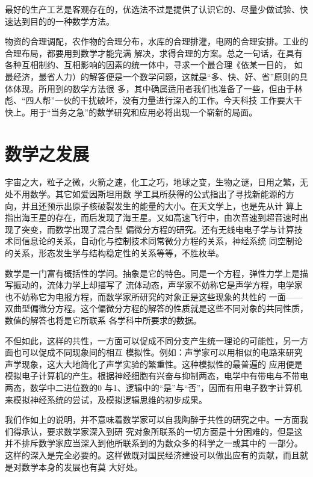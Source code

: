 \documentclass[twoside,openright,headings=optiontohead]{ctexbook} %
\begin{document}
{最好的生产工艺是客观存在的，优选法不过是提供了认识它的、尽量少做试验、快速达到目的的一种数学方法。

物资的合理调配，农作物的合理分布，水库的合理排灌，电网的合理安排。工业的合理布局，都要用到数学才能完满
解决，求得合理的方案。总之一句话，在具有各种互相制约、互相影响的因素的统一体中，寻求一个最合理《依某一目的，
如最经济，最省人力）的解答便是一个数学问题，这就是``多、快、好、省''原则的具体体现。所用到的数学方法很
多，其中确属适用者我们也准备了一些，但由于林彪、``四人帮''一伙的干扰破坏，没有力量进行深入的工作。今天科技
工作要大干快上。用于``当务之急''的数学研究和应用必将出现一个崭新的局面。

\hypertarget{ux6570ux5b66ux4e4bux53d1ux5c55}{%
\section*{数学之发展}\label{ux6570ux5b66ux4e4bux53d1ux5c55}}

宇宙之大，粒子之微，火箭之速，化工之巧，地球之变，生物之谜，日用之繁，无处不用数学。其它如爱因斯坦用数
学工具所获得的公式指出了寻找新能源的方向，并且还预示出原子核破裂发生的能量的大小。在天文学上，也是先从计
算上指出海王星的存在，而后发现了海王星。又如高速飞行中，由次音速到超音速时出现了突变，而数学出现了混合型
偏微分方程的研究。还有无线电电子学与计算技术同信息论的关系，自动化与控制技术同常微分方程的关系，神经系统
同空制论的关系，形态发生学与结构稳定性的关系等等，不胜枚举。

数学是一门富有概括性的学问。抽象是它的特色。同是一个方程，弹性力学上是描写振动的，流体力学上却描写了
流体动态，声学家不妨称它是声学方程，电学家也不妨称它为电报方程，而数学家所研究的对象正是这些现象的共性的
一面------双曲型偏微分方程。这个偏微分方程的解答的性质就是这些不同对象的共同性质，数值的解答也将是它所联系
各学科中所要求的数据。

不但如此，这样的共性，一方面可以促成不同分支产生统一理论的可能性，另一方面也可以促成不同现象间的相互
模拟性。例如：声学家可以用相似的电路来研究声学现象，这大大地简化了声学实验的繁重性。这种模拟性的最普遍的
应用便是模拟电子计算机的产生。根据神经细胞有兴奋与抑制两态，电学中有带电与不带电两态，数学中二进位数的0
与1、逻辑中的``是''与``否''，因而有用电子数字计算机来模拟神经系统的尝试，及模拟逻辑思维的初步成果。

我们作如上的说明，并不意味着数学家可以自我陶醉于共性的研究之中。一方面我们得承认，要求数学家深入到研
究对象所联系的一切方面是十分困难的，但是这并不排斥数学家应当深入到他所联系到的为数众多的科学之一或其中的
一部分。这样的深入是完全必要的。这样做既对国民经济建设可以做出应有的贡献，而且就是对数学本身的发展也有莫
大好处。

}
\end{document}
